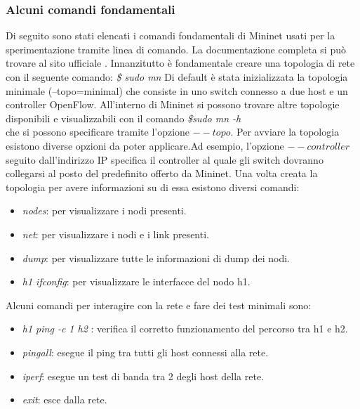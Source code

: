 \subsubsection{Alcuni comandi fondamentali}
Di seguito sono stati elencati i comandi fondamentali di Mininet usati per la sperimentazione tramite linea di comando.
La documentazione completa si può trovare al sito ufficiale \cite{walkmin}.
\newline Innanzitutto è fondamentale creare una topologia di rete con il seguente comando\cite{walkmin}:
\newline \textit{\$ sudo mn}
\newline Di default è stata inizializzata la topologia minimale (--topo=minimal) che consiste in uno switch connesso a due host e un controller OpenFlow.
All'interno di Mininet si possono trovare altre topologie disponibili e visualizzabili con il comando \newline \textit{\$sudo mn -h} \\che si possono specificare tramite l'opzione $--topo$.
\newline Per avviare la topologia esistono diverse opzioni da poter applicare.Ad esempio, l'opzione $--controller$ seguito dall'indirizzo IP specifica il controller al quale gli switch dovranno collegarsi al posto 
del predefinito offerto da Mininet.
\newline Una volta creata la topologia per avere informazioni su di essa esistono diversi comandi:
\begin{itemize}
    \item \textit{ nodes}: per visualizzare i nodi presenti.
    \item \textit{ net}: per visualizzare i nodi e i link presenti.
    \item \textit{ dump}: per visualizzare tutte le informazioni di dump dei nodi.
    \item \textit{h1 ifconfig}: per visualizzare le interfacce del nodo h1.
\end{itemize}
Alcuni comandi per interagire con la rete e fare dei test minimali sono:
\begin{itemize}
    \item \textit{ h1 ping -c 1 h2 }: verifica il corretto funzionamento del percorso tra h1 e h2.
    \item \textit{ pingall}: esegue il ping tra tutti gli host connessi alla rete.
    \item \textit{ iperf}: esegue un test di banda tra 2 degli host della rete.
    \item \textit{exit}: esce dalla rete.
\end{itemize}
